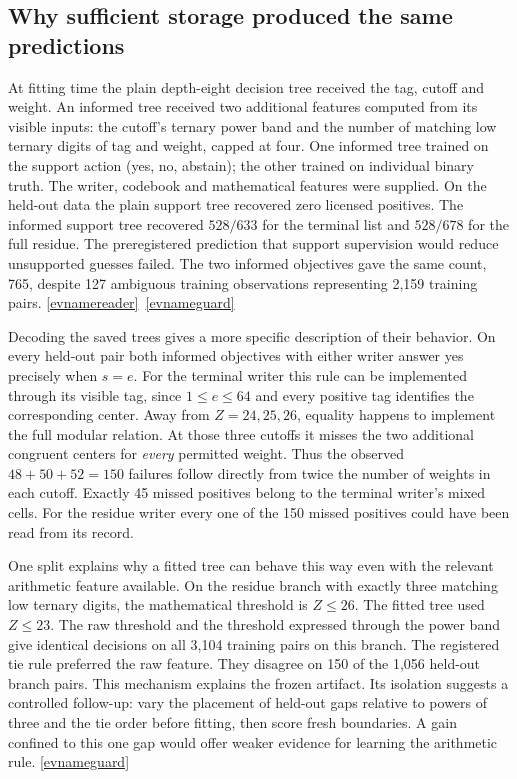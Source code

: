 \documentclass[11pt,letterpaper]{article}
\newcommand{\evref}[1]{\hyperlink{ev-#1}{\textsf{\small[\csname evname#1\endcsname]}}}
\begin{document}
\subsection{Why sufficient storage produced the same predictions}

At fitting time the plain depth-eight decision tree received the tag, cutoff and weight. An informed tree received two additional features computed from its visible inputs: the cutoff's ternary power band and the number of matching low ternary digits of tag and weight, capped at four. One informed tree trained on the support action (yes, no, abstain); the other trained on individual binary truth. The writer, codebook and mathematical features were supplied. On the held-out data the plain support tree recovered zero licensed positives. The informed support tree recovered \(528/633\) for the terminal list and \(528/678\) for the full residue. The preregistered prediction that support supervision would reduce unsupported guesses failed. The two informed objectives gave the same count, 765, despite 127 ambiguous training observations representing 2,159 training pairs. \evref{reader}\ \evref{guard}

Decoding the saved trees gives a more specific description of their behavior. On every held-out pair both informed objectives with either writer answer yes precisely when \(s=e\). For the terminal writer this rule can be implemented through its visible tag, since \(1\le e\le64\) and every positive tag identifies the corresponding center. Away from \(Z=24,25,26\), equality happens to implement the full modular relation. At those three cutoffs it misses the two additional congruent centers for \emph{every} permitted weight. Thus the observed \(48+50+52=150\) failures follow directly from twice the number of weights in each cutoff. Exactly 45 missed positives belong to the terminal writer's mixed cells. For the residue writer every one of the 150 missed positives could have been read from its record.

One split explains why a fitted tree can behave this way even with the relevant arithmetic feature available. On the residue branch with exactly three matching low ternary digits, the mathematical threshold is \(Z\le26\). The fitted tree used \(Z\le23\). The raw threshold and the threshold expressed through the power band give identical decisions on all 3,104 training pairs on this branch. The registered tie rule preferred the raw feature. They disagree on 150 of the 1,056 held-out branch pairs. This mechanism explains the frozen artifact. Its isolation suggests a controlled follow-up: vary the placement of held-out gaps relative to powers of three and the tie order before fitting, then score fresh boundaries. A gain confined to this one gap would offer weaker evidence for learning the arithmetic rule. \evref{guard}
\end{document}
